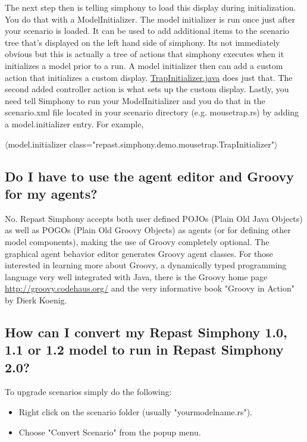 \documentclass[11pt]{article}
\begin{document}
The next step then is telling simphony to load this display during initialization. You do that with a ModelInitializer. The model initializer is run once just after your scenario is loaded. It can be used to add additional items to the scenario tree that's displayed on the left hand side of simphony. Its not immediately obvious but this is actually a tree of actions that simphony executes when it initializes a model prior to a run. A model initializer then can add a custom action that initializes a custom display.  \href{https://repast.github.io/docs/TrapInitializer.java}{TrapInitializer.java} does just that. The second added controller action is what sets up the custom display. Lastly, you need tell Simphony to run your ModelInitializer and you do that in the scenario.xml file located in your scenario directory (e.g. mousetrap.rs) by adding a model.initializer entry. For example,

$\langle$model.initializer class="repast.simphony.demo.mousetrap.TrapInitializer"$\rangle$

\subsection{Do I have to use the agent editor and Groovy for my agents?}
\label{prs:ae_groovy}

No. Repast Simphony accepts both user defined POJOs (Plain Old Java Objects) as well as POGOs (Plain Old Groovy Objects) as agents (or for defining other model components), making the use of Groovy completely optional. The graphical agent behavior editor generates Groovy agent classes. For those interested in learning more about Groovy, a dynamically typed programming language very well integrated with Java, there is the Groovy home page \url{http://groovy.codehaus.org/} and the very informative book "Groovy in Action" by Dierk Koenig.

\subsection{How can I convert my Repast Simphony 1.0, 1.1 or 1.2 model to run in Repast Simphony 2.0?}
\label{prs:convert}

To upgrade scenarios simply do the following:

\begin{itemize}
\item Right click on the scenario folder (usually "yourmodelname.rs").
\item Choose "Convert Scenario" from the popup menu.
\end{itemize}
\end{document}
